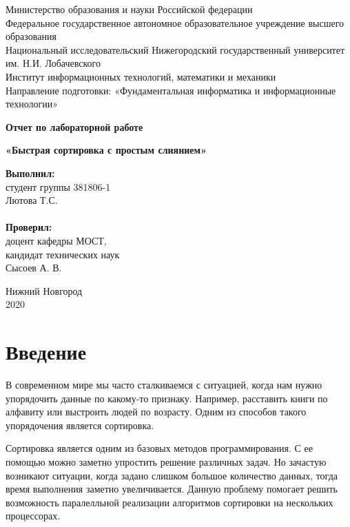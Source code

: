 \documentclass{report}
\begin{document}
\begin{titlepage}
\begin{center}
Министерство образования и науки Российской федерации \\
Федеральное государственное автономное образовательное учреждение высшего образования \\
Национальный исследовательский Нижегородский государственный университет им. Н.И. Лобачевского \\
Институт информационных технологий, математики и механики \\
Направление подготовки: «Фундаментальная информатика и информационные технологии»
\end{center}

\vspace{4em}

\begin{center}
\textbf{\Large Отчет по лабораторной работе}
\end{center}
\begin{center}
\textbf{\Large «Быстрая сортировка с простым слиянием»}
\end{center}

\vspace{4em}

\newbox{\lbox}
\newlength{\maxl}
\setlength{\maxl}{\wd\lbox}
\hfill\parbox{7cm}{
\textbf{Выполнил:} \\
студент группы 381806-1 \\
Лютова Т.С.\\
\\
\textbf{Проверил:}\\
доцент кафедры МОСТ, \\
кандидат технических наук \\
Сысоев А. В.\\ }
\vspace{\fill}

\begin{center} Нижний Новгород \\ 2020 \end{center}

\end{titlepage}

\setcounter{page}{2}

\tableofcontents
\newpage

\section*{Введение}
В современном мире мы часто сталкиваемся с ситуацией, когда нам нужно упорядочить данные по какому-то признаку. Например, расставить книги по алфавиту или выстроить людей по возрасту. Одним из способов такого упорядочения является сортировка.
\par Сортировка является одним из базовых методов программирования. С ее помощью можно заметно упростить решение различных задач. Но зачастую возникают ситуации, когда задано слишком большое количество данных, тогда время выполнения заметно увеличивается. Данную проблему помогает решить возможность паралелльной реализации алгоритмов сортировки на нескольких процессорах.
\end{document}

